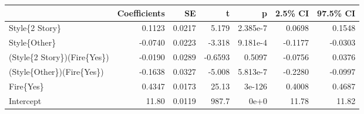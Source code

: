 \begin{tabular}{lrrrrrr}
\toprule
{} &  Coefficients &     SE &       t &        p &  2.5\% CI &  97.5\% CI \\
\midrule
Style\{2 Story\}              &        0.1123 & 0.0217 &   5.179 & 2.385e-7 &   0.0698 &    0.1548 \\
Style\{Other\}                &       -0.0740 & 0.0223 &  -3.318 & 9.181e-4 &  -0.1177 &   -0.0303 \\
(Style\{2 Story\})(Fire\{Yes\}) &       -0.0190 & 0.0289 & -0.6593 &   0.5097 &  -0.0756 &    0.0376 \\
(Style\{Other\})(Fire\{Yes\})   &       -0.1638 & 0.0327 &  -5.008 & 5.813e-7 &  -0.2280 &   -0.0997 \\
Fire\{Yes\}                   &        0.4347 & 0.0173 &   25.13 &   3e-126 &   0.4008 &    0.4687 \\
Intercept                   &         11.80 & 0.0119 &   987.7 &     0e+0 &    11.78 &     11.82 \\
\bottomrule
\end{tabular}
